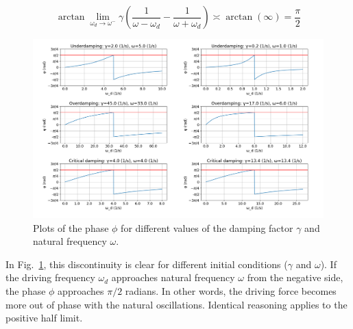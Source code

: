 \begin{equation*}
        \arctan \lim_{\omega_d \rightarrow \omega^-} {\gamma ( \frac{1}{\omega-\omega_d} - \frac{1}{\omega+\omega_d} )} \asymp \arctan(\infty) = \frac{\pi}{2}
\end{equation*}

\begin{figure}[H]
  \centering
  \includegraphics[width=1\textwidth]{oscillations/images/prep_exercise_Q3}
  \caption{Plots of the phase $\phi$ for different values of the damping factor $\gamma$ and natural frequency $\omega$.} 
  \label{fig:prep:phase}
\end{figure}

In Fig.~\ref{fig:prep:phase}, this discontinuity is clear for different initial conditions ($\gamma$ and $\omega$). If the driving frequency $\omega_d$ approaches natural frequency $\omega$ from the negative side, the phase $\phi$ approaches $\pi/2$ radians. In other words, the driving force becomes more out of phase with the natural oscillations. Identical reasoning applies to the positive half limit.
